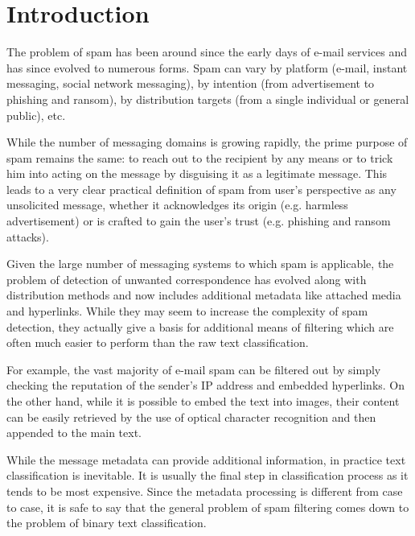 \documentclass[12pt]{report}
\begin{document}
\renewcommand{\bibname}{References}
\setcounter{tocdepth}{1}

\setcounter{page}{2}

\large

\thispagestyle{empty}
\tableofcontents
\thispagestyle{empty}


\chapter*{Introduction}

The problem of spam has been around since the early days of e-mail services and has since evolved to numerous forms. Spam can vary by platform (e-mail, instant messaging, social network messaging), by intention (from advertisement to phishing and ransom), by distribution targets (from a single individual or general public), etc.

While the number of messaging domains is growing rapidly, the prime purpose of spam remains the same: to reach out to the recipient by any means or to trick him into acting on the message by disguising it as a legitimate message. This leads to a very clear practical definition of spam from user's perspective as any unsolicited message, whether it acknowledges its origin (e.g. harmless advertisement) or is crafted to gain the user's trust (e.g. phishing and ransom attacks).

Given the large number of messaging systems to which spam is applicable, the problem of detection of unwanted correspondence has evolved along with distribution methods and now includes additional metadata like attached media and hyperlinks. While they may seem to increase the complexity of spam detection, they actually give a basis for additional means of filtering which are often much easier to perform than the raw text classification.

For example, the vast majority of e-mail spam can be filtered out by simply checking the reputation of the sender's IP address and embedded hyperlinks. On the other hand, while it is possible to embed the text into images, their content can be easily retrieved by the use of optical character recognition and then appended to the main text.

While the message metadata can provide additional information, in practice text classification is inevitable. It is usually the final step in classification process as it tends to be most expensive. Since the metadata processing is different from case to case, it is safe to say that the general problem of spam filtering comes down to the problem of binary text classification.
\end{document}
